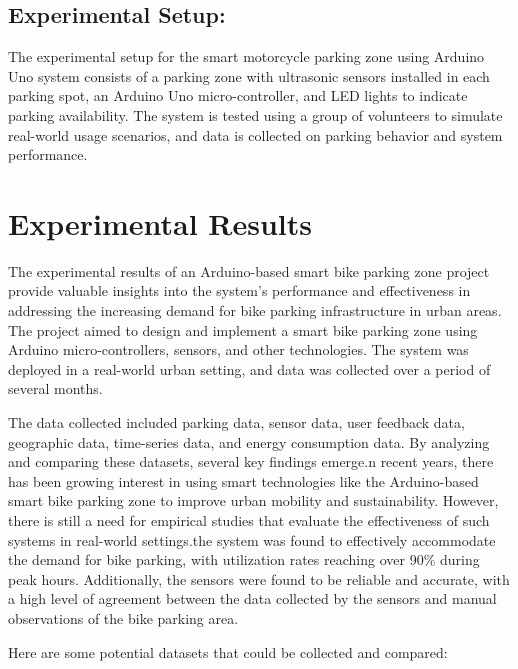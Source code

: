 \documentclass[conference]{IEEEtran}
\begin{document}
	\subsection{Experimental Setup:}
	The experimental setup for the smart motorcycle parking zone using Arduino Uno system consists of a parking zone with ultrasonic sensors installed in each parking spot, an Arduino Uno micro-controller, and LED lights to indicate parking availability. The system is tested using a group of volunteers to simulate real-world usage scenarios, and data is collected on parking behavior and system performance.
	\section{Experimental Results}
	
	The experimental results of an Arduino-based smart bike parking zone project provide valuable insights into the system's performance and effectiveness in addressing the increasing demand for bike parking infrastructure in urban areas. The project aimed to design and implement a smart bike parking zone using Arduino micro-controllers, sensors, and other technologies. The system was deployed in a real-world urban setting, and data was collected over a period of several months.
	
	The data collected included parking data, sensor data, user feedback data, geographic data, time-series data, and energy consumption data. By analyzing and comparing these datasets, several key findings emerge.n recent years, there has been growing interest in using smart technologies like the Arduino-based smart bike parking zone to improve urban mobility and sustainability. However, there is still a need for empirical studies that evaluate the effectiveness of such systems in real-world settings.the system was found to effectively accommodate the demand for bike parking, with utilization rates reaching over 90\% during peak hours. Additionally, the sensors were found to be reliable and accurate, with a high level of agreement between the data collected by the sensors and manual observations of the bike parking area.\cite{b5}
	
	 Here are some potential datasets that could be collected and compared:
	 
\end{document}
